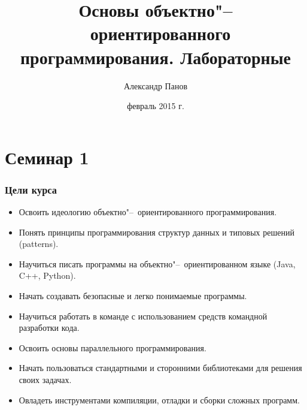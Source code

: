 \documentclass[default]{beamer}
\begin{document}
	
	\title[ООП. Лабораторные]{Основы объектно"--~ориентированного программирования.
		Лабораторные}
	\author[Панов]{Александр Панов}
	\date{февраль 2015 г.} 
	
	\begin{frame}
	\titlepage
	\end{frame}
	
	\section {Семинар 1}
	
	\begin{frame}
	\frametitle{Цели курса}
	
	\begin{itemize}
	\item Освоить идеологию объектно"--~ориентированного программирования.
	\item Понять принципы программирования структур данных и типовых решений
	(patterns).
	\item Научиться писать программы на объектно"--~ориентированном языке (Java,
	C++, Python).
	\item Начать создавать безопасные и легко понимаемые программы.
	\item Научиться работать в команде с использованием средств командной
	разработки кода.
	\item Освоить основы параллельного программирования.
	\item Начать пользоваться стандартными и сторонними библиотеками для решения
	своих задачах.
	\item Овладеть инструментами компиляции, отладки и сборки сложных программ.
	\end{itemize}
	\end{frame}
	
\end{document}
